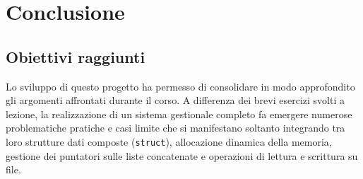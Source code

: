 \documentclass[11pt,a4paper,oneside,openany]{book}
\begin{document}
\chapter{Conclusione}

\section{Obiettivi raggiunti}
Lo sviluppo di questo progetto ha permesso di consolidare in modo approfondito gli argomenti affrontati durante il corso. A differenza dei brevi esercizi svolti a lezione, la realizzazione di un sistema gestionale completo fa emergere numerose problematiche pratiche e casi limite che si manifestano soltanto integrando tra loro strutture dati composte (\texttt{struct}), allocazione dinamica della memoria, gestione dei puntatori sulle liste concatenate e operazioni di lettura e scrittura su file.

\end{document}
